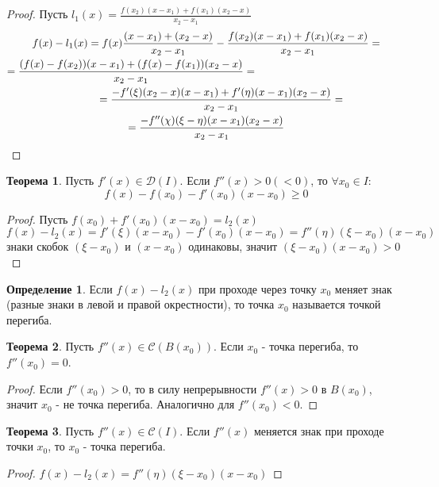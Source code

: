 \documentclass[a4paper, 12pt]{article}
\newcommand\tab[1][.5cm]{\hspace*{#1}}
\theoremstyle{definition}
\newtheorem*{definition}{Определение}
\newtheorem*{theorem}{Теорема}
\begin{document}
        \begin{proof}
            Пусть $l_1(x)=\frac{f(x_2)(x-x_1)+f(x_1)(x_2-x)}{x_2-x_1}$
            \begin{multline*}
                f(x)-l_1(x)=f(x)\frac{(x-x_1)+(x_2-x)}{x_2-x_1}-\frac{f(x_2)(x-x_1)+f(x_1)(x_2-x)}{x_2-x_1}=\\
                =\frac{(f(x)-f(x_2))(x-x_1)+(f(x)-f(x_1))(x_2-x)}{x_2-x_1}=\tab[5cm]\\
                \tab[1cm]=\frac{-f'(\xi)(x_2-x)(x-x_1)+f'(\eta)(x-x_1)(x_2-x)}{x_2-x_1}=\\=
                \frac{-f''(\chi)(\xi-\eta)(x-x_1)(x_2-x)}{x_2-x_1}
            \end{multline*}
        \end{proof} 
        \begin{theorem}
            Пусть $f'(x)\in \mathcal{D}(I)$. Если $f''(x)>0 (<0)$, то $\forall x_0\in I$:
            \[f(x)-f(x_0)-f'(x_0)(x-x_0)\geq 0\]
        \end{theorem} 
        \begin{proof}
            Пусть $f(x_0)+f'(x_0)(x-x_0)=l_2(x)$
            \[f(x)-l_2(x)=f'(\xi)(x-x_0)-f'(x_0)(x-x_0)=f''(\eta)(\xi-x_0)(x-x_0)\]
            знаки скобок $(\xi-x_0)$ и $(x-x_0)$ одинаковы, значит $(\xi-x_0)(x-x_0)>0$
        \end{proof} 
        \begin{definition}
            Если $f(x)-l_2(x)$ при проходе через точку $x_0$ меняет знак (разные знаки в левой и правой окрестности), то точка $x_0$ называется точкой перегиба.
        \end{definition}
        \begin{theorem}
            Пусть $f''(x)\in \mathcal{C}(B(x_0))$. Если $x_0$ - точка перегиба, то $f''(x_0)=0$.
        \end{theorem}  
        \begin{proof}
            Если $f''(x_0)>0$, то в силу непрерывности $f''(x)>0$ в $B(x_0)$, значит $x_0$ - не точка перегиба. Аналогично для $f''(x_0)<0$.
        \end{proof} 
        \begin{theorem}
            Пусть $f''(x)\in \mathcal{C}(I)$. Если $f''(x)$ меняется знак при проходе точки $x_0$, то $x_0$ - точка перегиба.
        \end{theorem} 
        \begin{proof}
            $f(x)-l_2(x)=f''(\eta)(\xi-x_0)(x-x_0)$
        \end{proof} 
\end{document}
